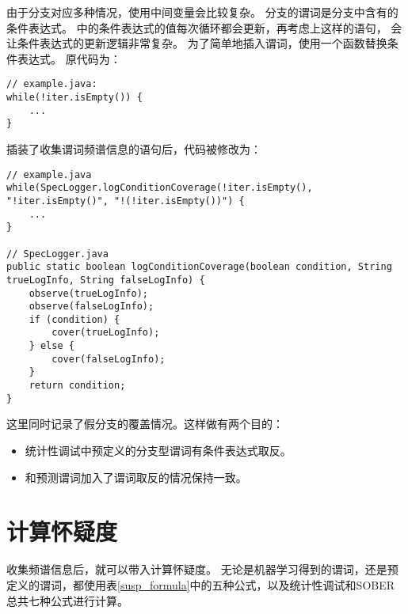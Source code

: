 由于分支对应多种情况，使用中间变量会比较复杂。
分支的谓词是分支中含有的条件表达式。
中的条件表达式的值每次循环都会更新，再考虑上这样的语句，
会让条件表达式的更新逻辑非常复杂。
为了简单地插入谓词，使用一个函数替换条件表达式。
原代码为：
\lstset{language=Java}
\begin{lstlisting}
// example.java:
while(!iter.isEmpty()) {
	...
}
\end{lstlisting}
插装了收集谓词频谱信息的语句后，代码被修改为：
\lstset{language=Java}
\begin{lstlisting}
// example.java
while(SpecLogger.logConditionCoverage(!iter.isEmpty(), "!iter.isEmpty()", "!(!iter.isEmpty())") {
	...
}

// SpecLogger.java
public static boolean logConditionCoverage(boolean condition, String trueLogInfo, String falseLogInfo) {
	observe(trueLogInfo);
	observe(falseLogInfo);
	if (condition) {
		cover(trueLogInfo);
	} else {
		cover(falseLogInfo);
	}
	return condition;
}
\end{lstlisting}
这里同时记录了假分支的覆盖情况。这样做有两个目的：
\begin{itemize}
\item 统计性调试中预定义的分支型谓词有条件表达式取反。
\item 和预测谓词加入了谓词取反的情况保持一致。
\end{itemize}

\section{计算怀疑度}

收集频谱信息后，就可以带入计算怀疑度。
无论是机器学习得到的谓词，还是预定义的谓词，都使用表\ref{susp_formula}中的五种公式，以及统计性调试和SOBER总共七种公式进行计算。

